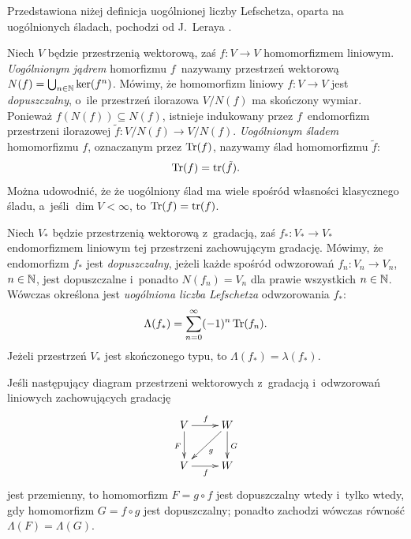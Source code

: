 Przedstawiona niżej definicja uogólnionej liczby Lefschetza, oparta na uogólnionych śladach, pochodzi od J.~Leraya \cite{Leray57}.

Niech $V$ będzie przestrzenią wektorową, zaś $f\colon V\to V$ homomorfizmem liniowym. \textit{Uogólnionym jądrem} homorfizmu $f$~nazywamy przestrzeń wektorową $N(f)=\bigcup_{n\in\mathbb{N}}\operatorname{ker}(f^n)$. Mówimy, że homomorfizm liniowy $f\colon V\to V$ jest \textit{dopuszczalny}, o~ile przestrzeń ilorazowa $V\big/N(f)$ ma skończony wymiar. Ponieważ $f(N(f))\subseteq N(f)$, istnieje indukowany przez $f$~endomorfizm przestrzeni ilorazowej $\tilde{f}\colon V\big/N(f)\to V\big/N(f)$. \textit{Uogólnionym śladem} homomorfizmu $f$, oznaczanym przez $\operatorname{Tr}(f)$, nazywamy ślad homomorfizmu $\tilde{f}$: \[\operatorname{Tr}(f)=\operatorname{tr}(\tilde{f}).\] Można udowodnić, że że uogólniony ślad ma wiele spośród własności klasycznego śladu, a~jeśli $\dim V<\infty$, to $\operatorname{Tr}(f)=\operatorname{tr}(f)$.

Niech $V_*$ będzie przestrzenią wektorową z~gradacją, zaś $f_*\colon V_*\to V_*$ endomorfizmem liniowym tej przestrzeni zachowującym gradację. Mówimy, że endomorfizm $f_*$ jest \textit{dopuszczalny}, jeżeli każde spośród odwzorowań $f_n\colon V_n\to V_n$, $n\in \mathbb{N}$, jest dopuszczalne i~ponadto $N(f_n)=V_n$ dla prawie wszystkich $n\in\mathbb{N}$. Wówczas określona jest \textit{uogólniona liczba Lefschetza} odwzorowania $f_*$: \[\Lambda(f_*)=\sum_{n=0}^{\infty}(-1)^n \operatorname{Tr}(f_n).\]Jeżeli przestrzeń $V_*$ jest skończonego typu, to $\Lambda(f_*)=\lambda(f_*)$.

\begin{lem}\label{lem-1szy_lemat_o_liczbie_lefschetza}
Jeśli następujący diagram przestrzeni wektorowych z~gradacją i~odwzorowań liniowych zachowujących gradację
\[\xymatrix{V\ar[r]^f\ar[d]_F & W\ar[d]^G\ar[dl]^g \\ V\ar[r]_f & W}\]
jest przemienny, to homomorfizm $F=g\circ f$ jest dopuszczalny wtedy i~tylko wtedy, gdy homomorfizm $G=f\circ g$ jest dopuszczalny; ponadto zachodzi wówczas równość $\Lambda(F)=\Lambda(G)$.
\end{lem}

